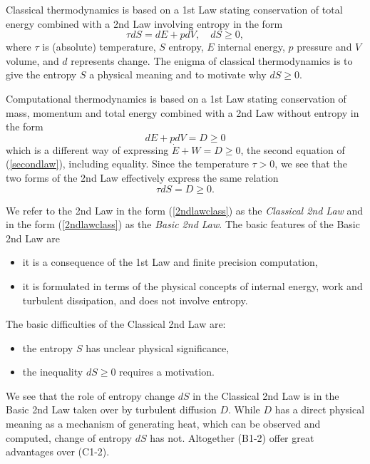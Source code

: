 \normalsize

Classical thermodynamics is based on a 1st Law stating conservation
of total energy combined with a 2nd Law involving entropy in the form
\begin{equation}\label{2ndlawclass}
\tau dS=dE+pdV, \quad dS\ge 0,
\end{equation}
where $\tau$ is (absolute) temperature, $S$ entropy, 
$E$ internal energy, $p$ pressure
and $V$ volume, and $d$ represents change. The enigma of classical
thermodynamics is to give the entropy $S$ a physical meaning and to motivate
why $dS\ge 0$.

Computational thermodynamics is based on a 1st Law stating
conservation of mass, momentum and total energy combined 
with a 2nd Law without entropy in the form
\begin{equation}\label{2ndlawnew}
dE+pdV =D\ge  0
\end{equation}
which is a different way of expressing $\dot E+W=D\ge 0$, the 
second equation of (\ref{secondlaw}), including equality. Since 
the temperature $\tau >0$, we see that the two forms of the 2nd Law 
effectively express the same relation 
\[
\tau dS=D\ge 0.
\]

We refer to the 2nd Law in the form (\ref{2ndlawclass}) as the 
\emph{Classical 2nd Law} and in the form (\ref{2ndlawclass})
as the \emph{Basic 2nd Law}. The basic features of the Basic 2nd Law
are
\begin{itemize} 
\item[(B1)] it is a consequence of the 1st Law and finite precision computation,
\item[(B2)] it is formulated in terms of the physical concepts
of internal energy, work and turbulent dissipation, and does not involve entropy.
\end{itemize}
The basic difficulties of the Classical 2nd Law
are:
\begin{itemize}  
\item[(C1)] the entropy $S$ has unclear physical significance,
\item[(C2)] the inequality $dS\ge 0$ requires a motivation.
\end{itemize}
We see that the role of entropy change $dS$ in the Classical
2nd Law is in the Basic 2nd Law taken over by turbulent diffusion $D$.
While $D$ has a direct physical meaning as a mechanism of generating heat,
 which can be observed and computed, change of entropy $dS$ 
has not. Altogether (B1-2) offer great advantages over
(C1-2). 
  

